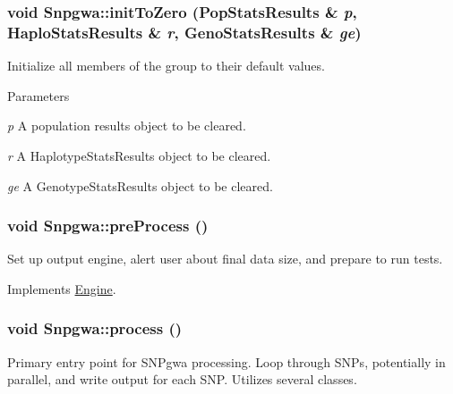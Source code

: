 \hypertarget{classSnpgwa_a5b8b5b406a9ad232ca818dee37d4830d}{
\subsubsection[{initToZero}]{\setlength{\rightskip}{0pt plus 5cm}void Snpgwa::initToZero ({\bf PopStatsResults} \& {\em p}, \/  {\bf HaploStatsResults} \& {\em r}, \/  {\bf GenoStatsResults} \& {\em ge})}}
\label{classSnpgwa_a5b8b5b406a9ad232ca818dee37d4830d}
Initialize all members of the group to their default values.


\begin{DoxyParams}{Parameters}
\item[{\em p}]A population results object to be cleared. \item[{\em r}]A HaplotypeStatsResults object to be cleared. \item[{\em ge}]A GenotypeStatsResults object to be cleared. \end{DoxyParams}
\hypertarget{classSnpgwa_aa20dc165d74036ff401ca182f5e980c2}{
\subsubsection[{preProcess}]{\setlength{\rightskip}{0pt plus 5cm}void Snpgwa::preProcess ()}}
\label{classSnpgwa_aa20dc165d74036ff401ca182f5e980c2}
Set up output engine, alert user about final data size, and prepare to run tests. 

Implements \hyperlink{classEngine_aec7076b8979a13c96eceb362437dc68c}{Engine}.

\hypertarget{classSnpgwa_a0d01afdbda7f3bb32586962cca76b69a}{
\subsubsection[{process}]{\setlength{\rightskip}{0pt plus 5cm}void Snpgwa::process ()}}
\label{classSnpgwa_a0d01afdbda7f3bb32586962cca76b69a}
Primary entry point for SNPgwa processing. Loop through SNPs, potentially in parallel, and write output for each SNP. Utilizes several classes.

